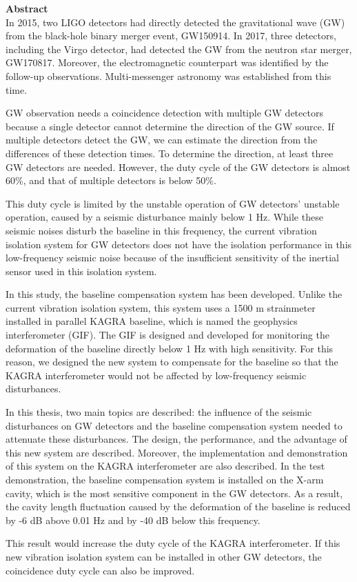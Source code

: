 \clearpage
{\huge \bf Abstract} \\

In 2015, two LIGO detectors had directly detected the gravitational wave (GW) from the black-hole binary merger event, GW150914. In 2017, three detectors, including the Virgo detector, had detected the GW from the neutron star merger, GW170817. Moreover, the electromagnetic counterpart was identified by the follow-up observations. Multi-messenger astronomy was established from this time.

GW observation needs a coincidence detection with multiple GW detectors because a single detector cannot determine the direction of the GW source. If multiple detectors detect the GW, we can estimate the direction from the differences of these detection times. To determine the direction, at least three GW detectors are needed. However, the duty cycle of the GW detectors is almost 60\%, and that of multiple detectors is below 50\%.

This duty cycle is limited by the unstable operation of GW detectors' unstable operation, caused by a seismic disturbance mainly below 1 Hz. While these seismic noises disturb the baseline in this frequency, the current vibration isolation system for GW detectors does not have the isolation performance in this low-frequency seismic noise because of the insufficient sensitivity of the inertial sensor used in this isolation system.

In this study, the baseline compensation system has been developed.  Unlike the current vibration isolation system, this system uses a 1500 m strainmeter installed in parallel KAGRA baseline, which is named the geophysics interferometer (GIF). The GIF is designed and developed for monitoring the deformation of the baseline directly below 1 Hz with high sensitivity. For this reason, we designed the new system to compensate for the baseline so that the KAGRA interferometer would not be affected by low-frequency seismic disturbances.

In this thesis, two main topics are described: the influence of the seismic disturbances on GW detectors and the baseline compensation system needed to attenuate these disturbances. The design, the performance, and the advantage of this new system are described. Moreover, the implementation and demonstration of this system on the KAGRA interferometer are also described. In the test demonstration, the baseline compensation system is installed on the X-arm cavity, which is the most sensitive component in the GW detectors. As a result, the cavity length fluctuation caused by the deformation of the baseline is reduced by -6 dB above 0.01 Hz and by -40 dB below this frequency.

This result would increase the duty cycle of the KAGRA interferometer. If this new vibration isolation system can be installed in other GW detectors, the coincidence duty cycle can also be improved. 

